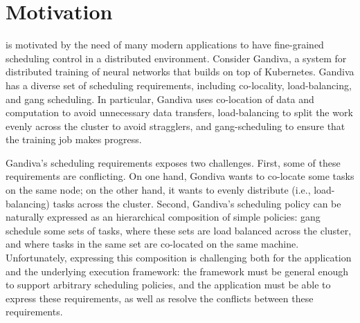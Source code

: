 \section{Motivation}
\label{sec:escher_motivation}


\name{} is motivated by the need of many modern applications to have fine-grained scheduling control in a distributed environment. Consider Gandiva\cite{gandiva}, a system for distributed training of neural networks that builds on top of Kubernetes\cite{kubernetes}. Gandiva has a diverse set of scheduling requirements, including co-locality, load-balancing, and gang scheduling. In particular, Gandiva uses co-location of data and computation to avoid unnecessary data transfers, load-balancing to split the work evenly across the cluster to avoid stragglers, and gang-scheduling to ensure that the training job makes progress. 

Gandiva's scheduling requirements exposes two challenges. First, some of these requirements are conflicting. On one hand, Gondiva wants to  co-locate some tasks on the same node; on the other hand, it wants to evenly distribute (i.e., load-balancing) tasks across the cluster. Second, Gandiva's scheduling policy can be naturally expressed as an hierarchical composition of simple policies: gang schedule some sets of tasks, where these sets are load balanced across the cluster, and where tasks in the same set are co-located on the same machine. Unfortunately, expressing this composition is challenging both for the application and the underlying execution framework: the framework must be general enough to support arbitrary scheduling policies, and the application must be able to express these requirements, as well as resolve the conflicts between these requirements. %

